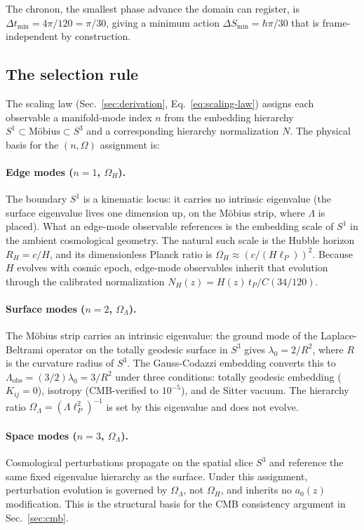 \documentclass[
    aps,
    prd,
    reprint,
    superscriptaddress,
    nofootinbib,
    floatfix
]{revtex4-2}
\begin{document}
The chronon, the smallest phase advance the domain can register, is
$\Delta t_\text{min} = 4\pi/120 = \pi/30$, giving a minimum action
$\Delta S_\text{min} = \hbar\pi/30$ that is frame-independent by
construction.

\subsection{The selection rule}
\label{app:framework-selection}

The scaling law (Sec.~\ref{sec:derivation},
Eq.~\ref{eq:scaling-law}) assigns each observable a manifold-mode
index $n$ from the embedding hierarchy
$S^1 \subset \text{M\"obius} \subset S^3$ and a corresponding
hierarchy normalization $N$. The physical basis for the
$(n, \Omega)$ assignment is:

\paragraph*{Edge modes ($n = 1$, $\Omega_H$).}
The boundary $S^1$ is a kinematic locus: it carries no intrinsic
eigenvalue (the surface eigenvalue lives one dimension up, on the
M\"obius strip, where $\Lambda$ is placed). What an edge-mode
observable references is the embedding scale of $S^1$ in the ambient
cosmological geometry. The natural such scale is the Hubble horizon
$R_H = c/H$, and its dimensionless Planck ratio is
$\Omega_H \approx (c/(H\ell_P))^2$. Because $H$ evolves with cosmic
epoch, edge-mode observables inherit that evolution through the
calibrated normalization $N_H(z) = H(z)\,t_P/C(34/120)$.

\paragraph*{Surface modes ($n = 2$, $\Omega_\Lambda$).}
The M\"obius strip carries an intrinsic eigenvalue: the ground mode
of the Laplace-Beltrami operator on the totally geodesic surface in
$S^3$ gives $\lambda_0 = 2/R^2$, where $R$ is the curvature radius
of $S^3$. The Gauss-Codazzi embedding converts this to
$\Lambda_\text{obs} = (3/2)\lambda_0 = 3/R^2$ under three
conditions: totally geodesic embedding ($K_{ij} = 0$), isotropy
(CMB-verified to $10^{-5}$), and de Sitter vacuum. The hierarchy
ratio $\Omega_\Lambda = (\Lambda\ell_P^2)^{-1}$ is set by this
eigenvalue and does not evolve.

\paragraph*{Space modes ($n = 3$, $\Omega_\Lambda$).}
Cosmological perturbations propagate on the spatial slice $S^3$ and
reference the same fixed eigenvalue hierarchy as the surface. Under
this assignment, perturbation evolution is governed by
$\Omega_\Lambda$, not $\Omega_H$, and inherits no $a_0(z)$
modification. This is the structural basis for the CMB consistency
argument in Sec.~\ref{sec:cmb}.
\end{document}
